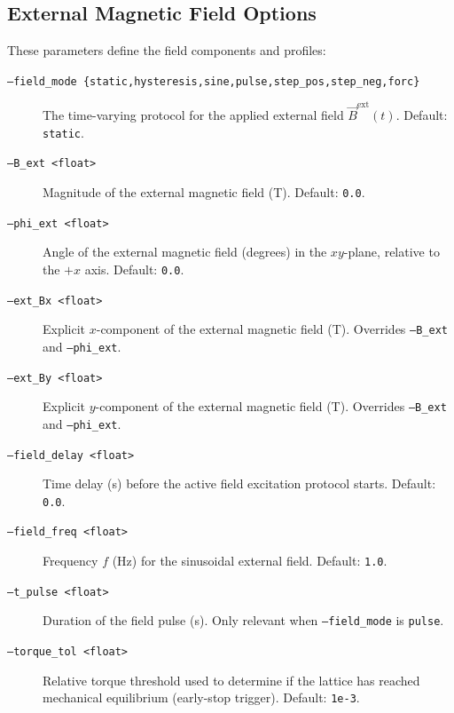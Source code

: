 \documentclass[11pt,a4paper]{article}
\newcommand{\code}[1]{\texttt{#1}}
\begin{document}
\subsection{External Magnetic Field Options}
These parameters define the field components and profiles:
\begin{description}
    \item[\code{--field\_mode \{static,hysteresis,sine,pulse,step\_pos,step\_neg,forc\}}] The time-varying protocol for the applied external field $\vec{B}^{\text{ext}}(t)$. Default: \code{static}.
    \item[\code{--B\_ext <float>}] Magnitude of the external magnetic field (\si{T}). Default: \code{0.0}.
    \item[\code{--phi\_ext <float>}] Angle of the external magnetic field (\si{degrees}) in the $xy$-plane, relative to the $+x$ axis. Default: \code{0.0}.
    \item[\code{--ext\_Bx <float>}] Explicit $x$-component of the external magnetic field (\si{T}). Overrides \code{--B\_ext} and \code{--phi\_ext}.
    \item[\code{--ext\_By <float>}] Explicit $y$-component of the external magnetic field (\si{T}). Overrides \code{--B\_ext} and \code{--phi\_ext}.
    \item[\code{--field\_delay <float>}] Time delay (\si{s}) before the active field excitation protocol starts. Default: \code{0.0}.
    \item[\code{--field\_freq <float>}] Frequency $f$ (\si{Hz}) for the sinusoidal external field. Default: \code{1.0}.
    \item[\code{--t\_pulse <float>}] Duration of the field pulse (\si{s}). Only relevant when \code{--field\_mode} is \code{pulse}.
    \item[\code{--torque\_tol <float>}] Relative torque threshold used to determine if the lattice has reached mechanical equilibrium (early-stop trigger). Default: \code{1e-3}.
\end{description}
\end{document}
